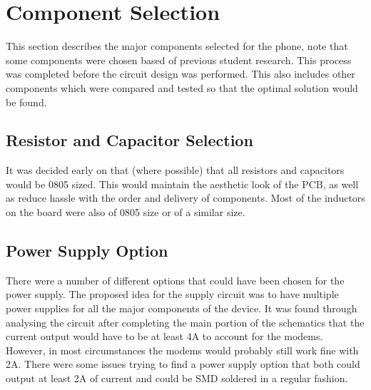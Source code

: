 
\section{Component Selection} 
\label{chap5sec1}
	
	This section describes the major components selected for the phone, note that some components were chosen based of previous student research.  
This process was completed before the circuit design was performed. 
This also includes other components which were compared and tested so that the optimal solution would be found. 


\subsection{Resistor and Capacitor Selection}

It was decided early on that (where possible) that all resistors and capacitors would be 0805 sized. 
This would maintain the aesthetic look of the PCB, as well as reduce hassle with the order and delivery of components. 
Most of the inductors on the board were also of 0805 size or of a similar size. 


\subsection{Power Supply Option}

	There were a number of different options that could have been chosen for the power supply. 
The proposed idea for the supply circuit was to have multiple power supplies for all the major components of the device. 
It was found through analysing the circuit after completing the main portion of the schematics that the current output would have to be at least 4A to account for the modems. 
However, in most circumstances the modems would probably still work fine with 2A. 
There were some issues trying to find a power supply option that both could output at least 2A of current and could be SMD soldered in a regular fashion. 

